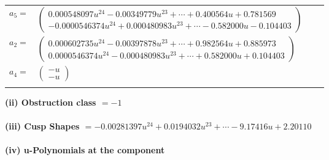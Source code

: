 \documentclass[1p]{elsarticle_modified}
\theoremstyle{definition}
\begin{document}
\begin{tabular}{m{7pt} m{180pt} m{7pt} m{180pt} }
\flushright $a_{5}=$&$\begin{pmatrix}0.000548097 u^{24}-0.00349779 u^{23}+\cdots+0.400564 u+0.781569\\-0.0000546374 u^{24}+0.000480983 u^{23}+\cdots-0.582000 u-0.104403\end{pmatrix}$ \\
\flushright $a_{2}=$&$\begin{pmatrix}0.000602735 u^{24}-0.00397878 u^{23}+\cdots+0.982564 u+0.885973\\0.0000546374 u^{24}-0.000480983 u^{23}+\cdots+0.582000 u+0.104403\end{pmatrix}$ \\
\flushright $a_{4}=$&$\begin{pmatrix}- u\\- u\end{pmatrix}$\\&\end{tabular}
\flushleft \textbf{(ii) Obstruction class $= -1$}\\~\\
\flushleft \textbf{(iii) Cusp Shapes $= -0.00281397 u^{24}+0.0194032 u^{23}+\cdots-9.17416 u+2.20110$}\\~\\
\newpage\renewcommand{\arraystretch}{1}
\flushleft \textbf{(iv) u-Polynomials at the component}\newline \\
\end{document}
